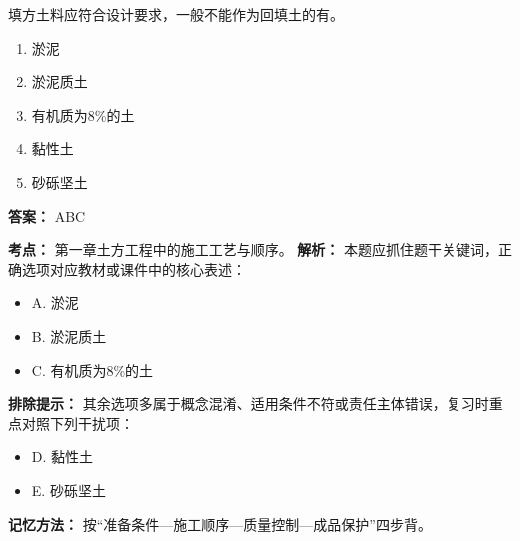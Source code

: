 \documentclass[UTF8,fontset=fandol,11pt]{ctexart}
\begin{document}
\vspace{0.2em}

\begin{quizbox}[title={第 17 题}]
填方土料应符合设计要求，一般不能作为回填土的有。\\
\begin{enumerate}[label=\Alph*.]
\item 淤泥
\item 淤泥质土
\item 有机质为8\%的土
\item 黏性土
\item 砂砾坚土
\end{enumerate}
\textbf{答案：} ABC
\vspace{0.25em}
\begin{answerbox}[title={考点解析}]
\textbf{考点：} 第一章土方工程中的施工工艺与顺序。
\textbf{解析：} 本题应抓住题干关键词，正确选项对应教材或课件中的核心表述：
\begin{itemize}
\item A. 淤泥
\item B. 淤泥质土
\item C. 有机质为8\%的土
\end{itemize}
\textbf{排除提示：} 其余选项多属于概念混淆、适用条件不符或责任主体错误，复习时重点对照下列干扰项：
\begin{itemize}
\item D. 黏性土
\item E. 砂砾坚土
\end{itemize}
\textbf{记忆方法：} 按“准备条件—施工顺序—质量控制—成品保护”四步背。
\end{answerbox}
\end{quizbox}

\vspace{0.2em}
\end{document}

